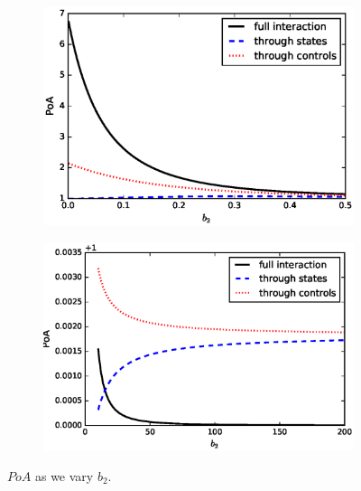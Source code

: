 \documentclass[11pt]{article}
\begin{document}
\begin{figure}[!htb]
    \centering
    \begin{subfigure}{.45\textwidth}
        \includegraphics[scale=0.5]{PoA_final_b2_0.eps}
    \end{subfigure}
    \begin{subfigure}{.45\textwidth}
        \includegraphics[scale=0.5]{PoA_final_b2_large.eps}
    \end{subfigure}
    \caption{$PoA$ as we vary $b_2$.}
    \label{fig:b2}
\end{figure}
\end{document}
